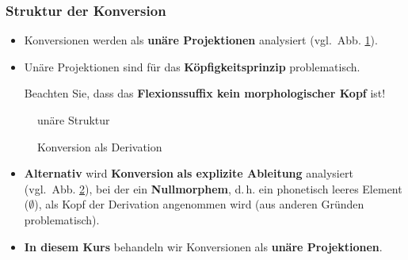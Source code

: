 \begin{frame}
\frametitle{Struktur der Konversion}

\begin{itemize}
\item Konversionen werden als \textbf{unäre Projektionen} analysiert (vgl.\ Abb. \ref{fig:5cKonUnary}). 

\item Unäre Projektionen sind für das \textbf{Köpfigkeitsprinzip} problematisch.

Beachten Sie, dass das \textbf{Flexionssuffix kein morphologischer Kopf} ist!

\end{itemize}

\begin{minipage}{.49\textwidth}

\begin{figure}	
\centering
{}
\caption{unäre Struktur}
\label{fig:5cKonUnary}
\end{figure}

\end{minipage}
%
\hfill %
\pause %
%
\begin{minipage}{.49\textwidth}

\begin{figure}	
\centering
{}
\caption{Konversion als Derivation}
\label{fig:5cKonDer}
\end{figure}

\end{minipage}	

\begin{itemize}
\item<2-> \textbf{Alternativ} wird \textbf{Konversion} \textbf{als explizite Ableitung} analysiert (vgl.\ Abb. \ref{fig:5cKonDer}), bei der ein \textbf{Nullmorphem}, d.\,h. ein phonetisch leeres Element ($\emptyset$), als Kopf der Derivation angenommen wird (aus anderen Gründen problematisch). 

\item<2-> \textbf{In diesem Kurs} behandeln wir Konversionen als \textbf{unäre Projektionen}.
\end{itemize}

\end{frame}


